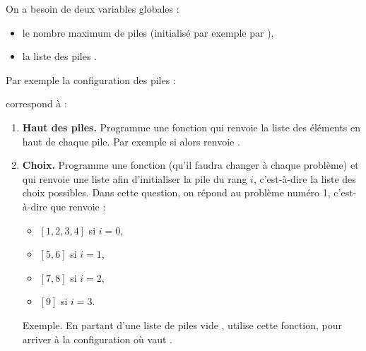\documentclass[11pt,class=report,crop=false]{standalone}
\begin{document}

\begin{activite}


On a besoin de deux variables globales : 
\begin{itemize}
  \item le nombre maximum de piles  (initialisé par exemple par ),
  \item la liste des piles .
\end{itemize}

Par exemple la configuration des piles :

  \medskip
  

correspond à :

\begin{enumerate}
  \item \textbf{Haut des piles.} Programme une fonction  qui renvoie la liste des éléments en haut de chaque pile.
  Par exemple si 
  alors  renvoie \ci{[4, 5, 2, 8]}.
    
  \item \textbf{Choix.} Programme une fonction  (qu'il faudra changer à chaque problème) et qui renvoie une liste afin d'initialiser la pile du rang $i$, c'est-à-dire la liste des choix possibles.
  Dans cette question, on répond au problème numéro 1, c'est-à-dire que 
  renvoie :
  \begin{itemize}
    \item $[1,2,3,4]$ si $i=0$,
    \item $[5,6]$ si $i=1$,
    \item $[7,8]$ si $i=2$,
    \item $[9]$ si $i=3$.
   \end{itemize}
 
   Exemple. En partant d'une liste de piles vide , utilise cette fonction, pour 
   arriver à la configuration où  vaut \ci{[ [1,2,3,4], [5,6], [7,8], [9] ]}.
   

\end{enumerate}
\end{activite}
\end{document}
